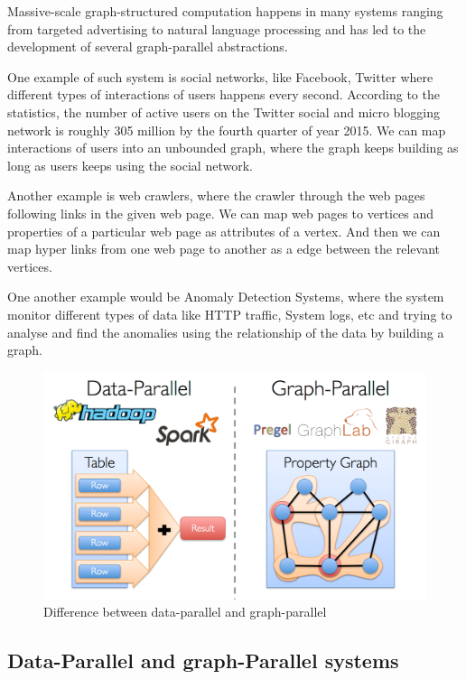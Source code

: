 \documentclass[12pt]{article}
\begin{document}
Massive-scale graph-structured computation happens in many systems ranging from targeted advertising to natural language processing and has led to the development of several graph-parallel abstractions. 

One example of such system is social networks, like Facebook, Twitter where different types of interactions of users happens every second. According to the statistics, the number of active users on the Twitter social and micro blogging network is roughly 305 million by the fourth quarter of  year 2015\cite{TwitterStats}. We can map interactions of users into an unbounded graph, where the graph keeps building as long as users keeps using the social network.

Another example is web crawlers, where the crawler through the web pages following links in the given web page. We can map web pages to vertices and properties of a particular web page as attributes of a vertex. And then we can map hyper links from one web page to another as a edge between the relevant vertices.  

One another example would be Anomaly  Detection Systems, where the system monitor different types of data like HTTP traffic, System logs, etc and trying to analyse and find the anomalies using the relationship of the data by building a graph.

\begin{figure}
\centering
\includegraphics[width=\textwidth]{image00.png}
\caption{Difference between data-parallel and graph-parallel}
\label{fig:parallel}
\end{figure}

\subsection{Data-Parallel and graph-Parallel systems}
\end{document}

